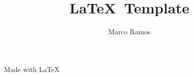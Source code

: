 \documentclass[a4paper]{article}
\title{\LaTeX\ Template}
\author[1]{Marco Ramos}
\affil[1]{Coventry University, Coventry, UK}
\begin{document}
	
	
	\newpage
	\restoregeometry		%
	\maketitle				%
	\thispagestyle{empty}	%
	\vfill					%
	\begin{center}
		Made with \LaTeX
	\end{center}
	
	
	\newpage
		
	
	
	
	
	\newpage
	\printbibliography
\end{document}

